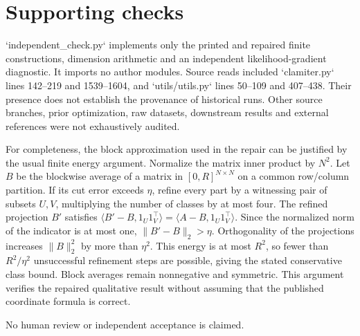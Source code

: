 \documentclass[10pt]{article}
\begin{document}
\section*{Supporting checks}
`independent\_check.py` implements only the printed and repaired finite constructions, dimension arithmetic and an independent likelihood-gradient diagnostic. It imports no author modules. Source reads included `clamiter.py` lines 142–219 and 1539–1604, and `utils/utils.py` lines 50–109 and 407–438. Their presence does not establish the provenance of historical runs. Other source branches, prior optimization, raw datasets, downstream results and external references were not exhaustively audited.\par
For completeness, the block approximation used in the repair can be justified by the usual finite energy argument. Normalize the matrix inner product by \(N^2\). Let \(B\) be the blockwise average of a matrix in \([0,R]^{N\times N}\) on a common row/column partition. If its cut error exceeds \(\eta\), refine every part by a witnessing pair of subsets \(U,V\), multiplying the number of classes by at most four. The refined projection \(B'\) satisfies \(\langle B'-B,1_U1_V^\top\rangle
=\langle A-B,1_U1_V^\top\rangle\). Since the normalized norm of the indicator is at most one, \(\|B'-B\|_2>\eta\). Orthogonality of the projections increases \(\|B\|_2^2\) by more than \(\eta^2\). This energy is at most \(R^2\), so fewer than \(R^2/\eta^2\) unsuccessful refinement steps are possible, giving the stated conservative class bound. Block averages remain nonnegative and symmetric. This argument verifies the repaired qualitative result without assuming that the published coordinate formula is correct.\par
No human review or independent acceptance is claimed.\par
\end{document}
